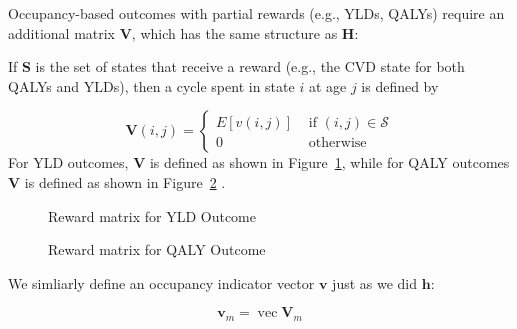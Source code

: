 \documentclass[
]{agujournal2019}
\begin{document}
Occupancy-based outcomes with partial rewards (e.g., YLDs, QALYs)
require an additional matrix \(\mathbf{V}\), which has the same
structure as \(\mathbf{H}\):

If \(\mathbf{S}\) is the set of states that receive a reward (e.g., the
CVD state for both QALYs and YLDs), then a cycle spent in state \(i\) at
age \(j\) is defined by

\[
\mathbf{V}(i, j)= \begin{cases}E\left[v(i, j)\right] & \text { if }(i, j) \in \mathcal{S} \\ 0 & \text { otherwise }\end{cases}
\] For YLD outcomes, \(\mathbf{V}\) is defined as shown in
Figure~\ref{fig-V-yld}, while for QALY outcomes \(\mathbf{V}\) is
defined as shown in Figure~\ref{fig-V-qaly} .

\begin{figure}


\caption{\label{fig-V-yld}Reward matrix for YLD Outcome}

\end{figure}%

\begin{figure}


\caption{\label{fig-V-qaly}Reward matrix  for QALY Outcome}

\end{figure}%

We simliarly define an occupancy indicator vector \(\mathbf{v}\) just as
we did \(\mathbf{h}\):

\[
\mathbf{v}_{m}=\operatorname{vec} \mathbf{V}_{m}
\]
\end{document}

